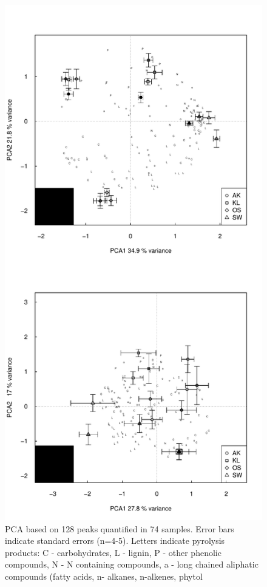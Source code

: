 \documentclass[preprint,review,12pt]{elsarticle}
\begin{document}
\newpage
\begin{figure}[h!]
\begin{center}
\includegraphics{pyrpaper-pca1}
\end{center}
\caption{PCA based on 128 peaks quantified in 74 samples. Error bars indicate standard errors (n=4-5). Letters indicate pyrolysis products:  C - carbohydrates, L - lignin, P - other phenolic compounds, N - N containing compounds,  a - long chained aliphatic compounds (fatty acids, n- alkanes, n-alkenes, phytol}
\label{fig:pca1}
\end{figure}
\end{document}
